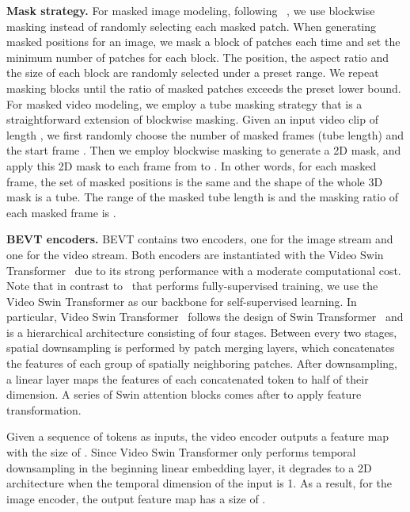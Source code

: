 \documentclass[10pt,twocolumn,letterpaper]{article}
\makeatletter
\newcommand*{\system}{BEVT\@\xspace}
\makeatother
\begin{document}
\vspace{0.05in}
\noindent\textbf{Mask strategy.} For masked image modeling, following ~\cite{bao2021beit}, we use blockwise masking instead of randomly selecting each masked patch. When generating masked positions for an image, we mask a block of patches each time and set the minimum number of patches for each block. The position, the aspect ratio and the size of each block are randomly selected under a preset range. We repeat masking blocks until the ratio of masked patches exceeds the preset lower bound. For masked video modeling, we employ a tube masking strategy that is a straightforward extension of blockwise masking. Given an input video clip of length , we first randomly choose the number of masked frames (tube length)  and the start frame . Then we employ blockwise masking to generate a 2D mask, and apply this 2D mask to each frame from  to . In other words, for each masked frame, the set of masked positions is the same and the shape of the whole 3D mask is a tube. The range of the masked tube length is  and the masking ratio of each masked frame is .


\vspace{0.05in}
\noindent\textbf{\system encoders.}  \system contains two encoders, one for the image stream and one for the video stream. Both encoders are instantiated with the Video Swin Transformer~\cite{liu2021video} due to its strong performance with a moderate computational cost. Note that in contrast to~\cite{liu2021video} that performs fully-supervised training, we use the Video Swin Transformer as our backbone for self-supervised learning. In particular, Video Swin Transformer~\cite{liu2021video} follows the design of Swin Transformer~\cite{liu2021swin} and is a hierarchical architecture consisting of four stages. Between every two stages, spatial downsampling is performed by patch merging layers, which concatenates the features of each group of   spatially neighboring patches. After downsampling, a linear layer maps the features of each concatenated token to half of their dimension. A series of Swin attention blocks comes after to apply feature transformation.  

Given a sequence of tokens as inputs, the video encoder outputs a feature map with the size of . Since Video Swin Transformer only performs temporal downsampling in the beginning linear embedding layer, it degrades to a 2D architecture when the temporal dimension of the input is 1. As a result, for the image encoder, the output feature map has a size of . 
\end{document}
